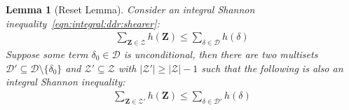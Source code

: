 \documentclass[10pt,a4paper]{article}
\newtheorem{lemma}{Lemma}[section]
\newcommand{\calD}{\mathcal D}
\newcommand{\calZ}{\mathcal Z}
\begin{document}
\begin{lemma}[Reset Lemma] \label{lemma:reset} Consider an integral Shannon inequality~\eqref{eqn:integral:ddr:shearer}:
  \begin{align*}
    \sum_{\bm Z \in \calZ}h(\bm Z) \leq \sum_{\delta \in \calD} h(\delta)
  \end{align*}
  Suppose some term $\delta_0 \in \calD$ is {\em unconditional}, then there are two
  multisets $\calD' \subseteq \calD \setminus \{\delta_0\}$ and $\calZ' \subseteq \calZ$
  with $|\calZ'| \geq |\calZ|-1$
  such that the following is also an integral Shannon inequality:
  \begin{align*}
    \sum_{\bm Z \in \calZ'}h(\bm Z) \leq \sum_{\delta \in \calD'} h(\delta)
  \end{align*}
\end{lemma}
\end{document}
